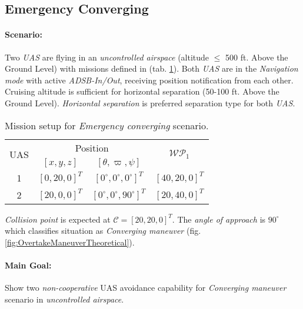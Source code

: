 \newpage
\subsection{Emergency Converging}\label{s:testEmergencyConverging}

\paragraph{Scenario:} Two \emph{UAS} are flying in an \emph{uncontrolled airspace} (altitude $\le$ 500 ft. Above the Ground Level) with missions defined in (tab. \ref{tab:missionSetupEmergencyConvergingScenario}). Both \emph{UAS} are in the \emph{Navigation mode} with active \emph{ADSB-In/Out}, receiving position notification from each other. Cruising altitude is sufficient for horizontal separation (50-100 ft. Above the Ground Level). \emph{Horizontal separation} is preferred separation type for both \emph{UAS}.

\begin{table}[H]
    \centering
    \begin{tabular}{c||c|c||c}
        \multirow{2}{*}{UAS} &\multicolumn{2}{c||}{Position} & \multirow{2}{*}{$\mathscr{WP}_1$} \\\cline{2-3}
          & $[x,y,z]$           & $[\theta,\varpi,\psi]$           & \\\hline\hline
        1 & $[0,20,0]^T $       & $[0^\circ,0^\circ,0^\circ]^T$    & $[40,20,0]^T$\\\hline 
        2 & $[20,0,0]^T $       & $[0^\circ,0^\circ,90^\circ]^T$  & $[20,40,0]^T$\\ 
    \end{tabular}
    \caption{Mission setup for \emph{Emergency converging} scenario.}
    \label{tab:missionSetupEmergencyConvergingScenario}
\end{table}

\begin{note}
\emph{Collision point} is expected at $\mathscr{C} = [20,20,0]^T$. The \emph{angle of approach} is $90^{\circ}$ which classifies situation as \emph{Converging maneuver} (fig. \ref{fig:OvertakeManeuverTheoretical}).
\end{note}

\paragraph{Main Goal:} Show two \emph{non-cooperative} UAS avoidance capability for \emph{Converging maneuver} scenario in \emph{uncontrolled airspace}.


